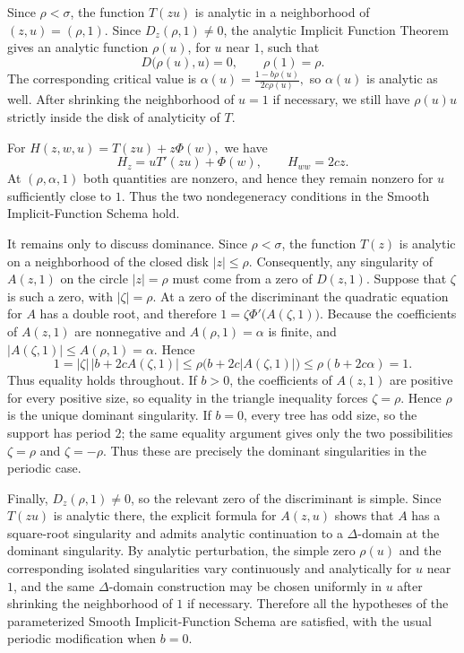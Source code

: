 \documentclass[11pt, onesided]{amsart}
\theoremstyle{remark}
\begin{document}
Since $\rho<\sigma$, the function $T(zu)$ is analytic in a neighborhood of
$(z,u)=(\rho,1)$.  Since $D_z(\rho,1)\neq0$, the analytic Implicit Function
Theorem gives an analytic function $\rho(u)$, for $u$ near $1$, such that
\[
D\big(\rho(u),u\big)=0,
\qquad \rho(1)=\rho.
\]
The corresponding critical value is
$
\alpha(u)=\frac{1-b\rho(u)}{2c\rho(u)},
$
so $\alpha(u)$ is analytic as well.  After shrinking the neighborhood of
$u=1$ if necessary, we still have $\rho(u)u$ strictly inside the disk of
analyticity of $T$.

For
$
H(z,w,u)=T(zu)+z\Phi(w),
$
we have
\[
H_z=uT'(zu)+\Phi(w),
\qquad
H_{ww}=2cz.
\]
At $(\rho,\alpha,1)$ both quantities are nonzero, and hence they remain
nonzero for $u$ sufficiently close to $1$.  Thus the two nondegeneracy
conditions in the Smooth Implicit-Function Schema hold.

It remains only to discuss dominance.  Since $\rho<\sigma$, the function
$T(z)$ is analytic on a neighborhood of the closed disk $|z|\leq\rho$.
Consequently, any singularity of $A(z,1)$ on the circle $|z|=\rho$ must
come from a zero of $D(z,1)$.  Suppose that $\zeta$ is such a zero, with
$|\zeta|=\rho$.  At a zero of the discriminant the quadratic equation for
$A$ has a double root, and therefore
$
1=\zeta\Phi'\big(A(\zeta,1)\big).
$
Because the coefficients of $A(z,1)$ are nonnegative and $A(\rho,1)=\alpha$
is finite, and
$
|A(\zeta,1)|\leq A(\rho,1)=\alpha.
$
Hence
\[
1
=|\zeta|\,|b+2cA(\zeta,1)|
\leq \rho\bigl(b+2c|A(\zeta,1)|\bigr)
\leq \rho(b+2c\alpha)
=1.
\]
Thus equality holds throughout.  If $b>0$, the coefficients of $A(z,1)$
are positive for every positive size, so equality in the triangle
inequality forces $\zeta=\rho$.  Hence $\rho$ is the unique dominant
singularity.  If $b=0$, every tree has odd size, so the support has period
$2$; the same equality argument gives only the two possibilities
$\zeta=\rho$ and $\zeta=-\rho$.  Thus these are precisely the dominant
singularities in the periodic case.

Finally, $D_z(\rho,1)\neq0$, so the relevant zero of the discriminant is
simple.  Since $T(zu)$ is analytic there, the explicit formula for $A(z,u)$
shows that $A$ has a square-root singularity and admits analytic
continuation to a $\Delta$-domain at the dominant singularity.  By analytic
perturbation, the simple zero $\rho(u)$ and the corresponding isolated
singularities vary continuously and analytically for $u$ near $1$, and the
same $\Delta$-domain construction may be chosen uniformly in $u$ after
shrinking the neighborhood of $1$ if necessary.  Therefore all the
hypotheses of the parameterized Smooth Implicit-Function Schema are
satisfied, with the usual periodic modification when $b=0$.
\end{document}
